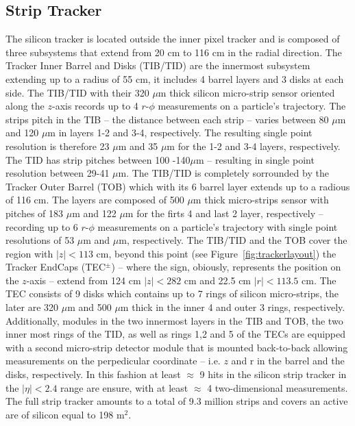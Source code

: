 \subsection{Strip Tracker}
The silicon tracker is located outside the inner pixel tracker and is
composed of three subsystems that extend from 20 cm to 116 cm in the
radial direction. The Tracker Inner Barrel and Disks (TIB/TID) are
the innermost subsystem extending up to a radius of 55 cm, it includes
4 barrel layers and 3 disks at each side. The TIB/TID with their 320
$\mu$m thick silicon micro-strip sensor oriented along the $z$-axis records up to 4 $r$-$\phi$
measurements on a particle's trajectory. The strips pitch  in the TIB -- the
distance between each strip -- varies between 80 $\mu$m and 120 $\mu$m
in layers 1-2 and 3-4, respectively. The resulting single point
resolution is therefore 23 $\mu$m and 35 $\mu$m for the 1-2 and 3-4
layers, respectively. The TID has strip pitches between 100 -140$\mu$m
-- resulting in single point resolution between 29-41 $\mu$m. The
TIB/TID is completely sorrounded by the Tracker Outer Barrel (TOB)
which with its 6 barrel layer extends up to a radious of 116 cm. The
layers are composed of 500 $\mu$m thick micro-strips sensor with
pitches of 183 $\mu$m and 122 $\mu$m for the firts 4  and last 2
layer, respectively -- recording up to 6 $r$-$\phi$
measurements on a particle's trajectory with single point resolutions of 53 $\mu$m
and $\mu$m, respectively. The TIB/TID and the TOB cover the region
with $|z|< 113$ cm, beyond this point (see
Figure~\ref{fig:trackerlayout}) the Tracker EndCaps (TEC$^{\pm}$) --
where the sign, obiously, represents the position on the $z$-axis --
extend from 124 cm $|z|< 282$ cm and 22.5 cm $|r|< 113.5$ cm. The TEC
consists of 9 disks which contains up to 7 rings of silicon
micro-strips, the later are 320 $\mu$m and 500 $\mu$m thick in the
inner 4 and outer 3 rings, respectively.
Additionally, modules in the two innermost layers in the TIB and TOB,
the two inner most rings of the TID, as well as rings 1,2 and 5 of the TECs are
equipped with a second micro-strip detector module that is mounted
back-to-back allowing measurements on the perpedicular coordinate --
i.e. $z$ and r in the barrel and the disks, respectively. In this
fashion at least $\approx$ 9 hits in the silicon strip tracker in the
$|\eta|<2.4$ range are ensure, with at least $\approx$ 4
two-dimensional measurements. The full strip tracker amounts to a
total of 9.3 million strips and covers an active are of silicon equal
to 198 m$^2$.

